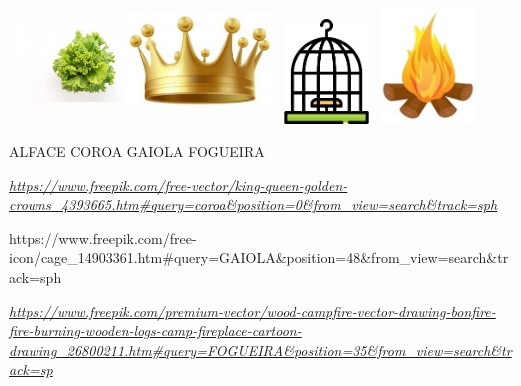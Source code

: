 \includegraphics[width=1.22307in,height=1.24422in]{media/image86.jpg}\includegraphics[width=1.53669in,height=1.29710in]{media/image87.jpg}\includegraphics[width=1.09375in,height=1.09375in]{media/image88.png}\includegraphics[width=1.03854in,height=1.20356in]{media/image89.jpg}

ALFACE COROA GAIOLA FOGUEIRA

\href{https://www.freepik.com/free-vector/king-queen-golden-crowns_4393665.htm\#query=coroa\&position=0\&from_view=search\&track=sph}{\emph{https://www.freepik.com/free-vector/king-queen-golden-crowns\_4393665.htm\#query=coroa\&position=0\&from\_view=search\&track=sph}}

https://www.freepik.com/free-icon/cage\_14903361.htm\#query=GAIOLA\&position=48\&from\_view=search\&track=sph

\href{https://www.freepik.com/premium-vector/wood-campfire-vector-drawing-bonfire-fire-burning-wooden-logs-camp-fireplace-cartoon-drawing_26800211.htm\#query=FOGUEIRA\&position=35\&from_view=search\&track=sp}{\emph{https://www.freepik.com/premium-vector/wood-campfire-vector-drawing-bonfire-fire-burning-wooden-logs-camp-fireplace-cartoon-drawing\_26800211.htm\#query=FOGUEIRA\&position=35\&from\_view=search\&track=sp}}

